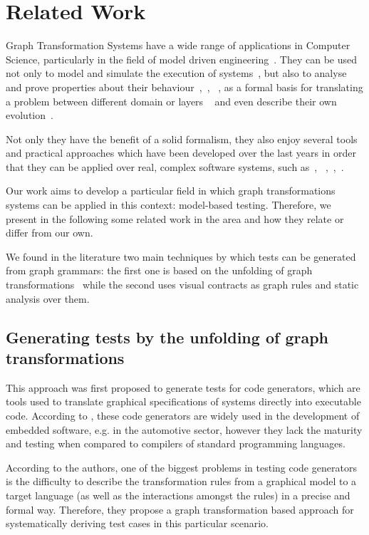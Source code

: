 \chapter{Related Work}\label{ch:related-work}

Graph Transformation Systems have a wide range of applications in Computer Science, particularly in the field of model driven engineering~\cite{modelDriven}. They can be used not only to model and simulate the execution of systems~\cite{Ehrig2009}, but also to analyse and prove properties about their behaviour~\cite{Lambers},~\cite{dissertacaoDoCarinha}, ~\cite{Penneman}, as a formal basis for translating a problem between different domain or layers ~\cite{tripleGraphGrammars} and even describe their own evolution~\cite{Machado2012}.

Not only they have the benefit of a solid formalism, they also enjoy several tools and practical approaches which have been developed over the last years in order that they can be applied over real, complex software systems, such as~\cite{AGG}, ~\cite{Groove},~\cite{Henshin},~\cite{GrGen.Net}.

Our work aims to develop a particular field in which graph transformations systems can be applied in this context: model-based testing. Therefore, we present in the following some related work in the area and how they relate or differ from our own.

We found in the literature two main techniques by which tests can be generated from graph grammars: the first one is based on the unfolding of graph transformations~\cite{Baldan2004} while the second uses visual contracts as graph rules and static analysis over them.

\section{Generating tests by the unfolding of graph transformations}

This approach was first proposed to generate tests for code generators, which are tools used to translate graphical specifications of systems directly into executable code. According to \cite{Baldan2004}, these code generators are widely used in the development of embedded software, e.g. in the automotive sector, however they lack the maturity and testing when compared to compilers of standard programming languages.

According to the authors, one of the biggest problems in testing code generators is the difficulty to describe the transformation rules from a graphical model to a target language (as well as the interactions amongst the rules) in a precise and formal way. Therefore, they propose a graph transformation based approach for systematically deriving test cases in this particular scenario.

